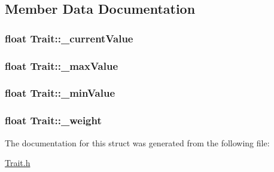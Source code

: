 \subsection{Member Data Documentation}
\hypertarget{struct_trait_ad3edb188a38caca17a4a947be9667f04}{
\subsubsection[{\_\-currentValue}]{\setlength{\rightskip}{0pt plus 5cm}float {\bf Trait::\_\-currentValue}}}
\label{d2/dab/struct_trait_ad3edb188a38caca17a4a947be9667f04}
\hypertarget{struct_trait_aac03d70d4f669f36d8aaf40747df42fe}{
\subsubsection[{\_\-maxValue}]{\setlength{\rightskip}{0pt plus 5cm}float {\bf Trait::\_\-maxValue}}}
\label{d2/dab/struct_trait_aac03d70d4f669f36d8aaf40747df42fe}
\hypertarget{struct_trait_a1b41aeaad4c3eb2a9fa6dc2c7b01add4}{
\subsubsection[{\_\-minValue}]{\setlength{\rightskip}{0pt plus 5cm}float {\bf Trait::\_\-minValue}}}
\label{d2/dab/struct_trait_a1b41aeaad4c3eb2a9fa6dc2c7b01add4}
\hypertarget{struct_trait_a53d78764a07dd12fa421ddac0f198d34}{
\subsubsection[{\_\-weight}]{\setlength{\rightskip}{0pt plus 5cm}float {\bf Trait::\_\-weight}}}
\label{d2/dab/struct_trait_a53d78764a07dd12fa421ddac0f198d34}


The documentation for this struct was generated from the following file:\begin{DoxyCompactItemize}
\item 
\hyperlink{_trait_8h}{Trait.h}\end{DoxyCompactItemize}

